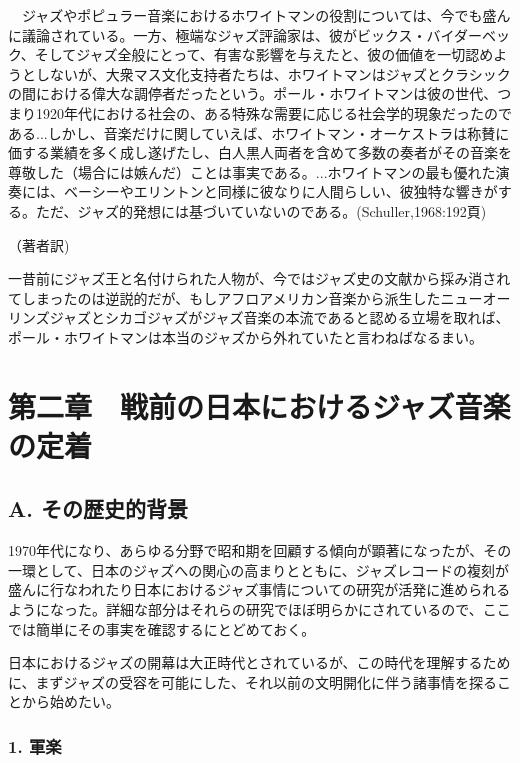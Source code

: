 \begin{gquote}
　ジャズやポピュラー音楽におけるホワイトマンの役割については、今でも盛んに議論されている。一方、極端なジャズ評論家は、彼がビックス・バイダーベック、そしてジャズ全般にとって、有害な影響を与えたと、彼の価値を一切認めようとしないが、大衆マス文化支持者たちは、ホワイトマンはジャズとクラシックの間における偉大な調停者だったという。ポール・ホワイトマンは彼の世代、つまり1920年代における社会の、ある特殊な需要に応じる社会学的現象だったのである...しかし、音楽だけに関していえば、ホワイトマン・オーケストラは称賛に価する業績を多く成し遂げたし、白人黒人両者を含めて多数の奏者がその音楽を尊敬した（場合には嫉んだ）ことは事実である。...ホワイトマンの最も優れた演奏には、ベーシーやエリントンと同様に彼なりに人間らしい、彼独特な響きがする。ただ、ジャズ的発想には基づいていないのである。(Schuller,1968:192頁)
\end{gquote}

（著者訳)

一昔前にジャズ王と名付けられた人物が、今ではジャズ史の文献から採み消されてしまったのは逆説的だが、もしアフロアメリカン音楽から派生したニューオーリンズジャズとシカゴジャズがジャズ音楽の本流であると認める立場を取れば、ポール・ホワイトマンは本当のジャズから外れていたと言わねばなるまい。

\section{第二章　戦前の日本におけるジャズ音楽の定着}

\subsection{A. その歴史的背景}

1970年代になり、あらゆる分野で昭和期を回顧する傾向が顕著になったが、その一環として、日本のジャズへの関心の高まりとともに、ジャズレコードの複刻が盛んに行なわれたり日本におけるジャズ事情についての研究が活発に進められるようになった。詳細な部分はそれらの研究でほぼ明らかにされているので、ここでは簡単にその事実を確認するにとどめておく。

日本におけるジャズの開幕は大正時代とされているが、この時代を理解するために、まずジャズの受容を可能にした、それ以前の文明開化に伴う諸事情を探ることから始めたい。

\subsubsection{1. 軍楽}

